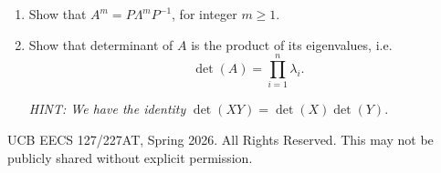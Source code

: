 \documentclass[10pt]{article}
\begin{document}
\begin{enumerate}[label=(\alph*)]
\item Show that $A^m = P\Lambda^m P^{-1}$, for integer $m \geq 1$.

\vspace{10cm}

\item Show that determinant of $A$ is the product of its eigenvalues, i.e.
\begin{equation}
\det(A) = \prod_{i=1}^{n} \lambda_i.
\end{equation}

\textit{HINT: We have the identity} $\det(XY) = \det(X)\det(Y)$.

\vspace{8cm}

\end{enumerate}

\vfill
\noindent\textcopyright{} UCB EECS 127/227AT, Spring 2026. All Rights Reserved. This may not be publicly shared without explicit permission.
\end{document}
